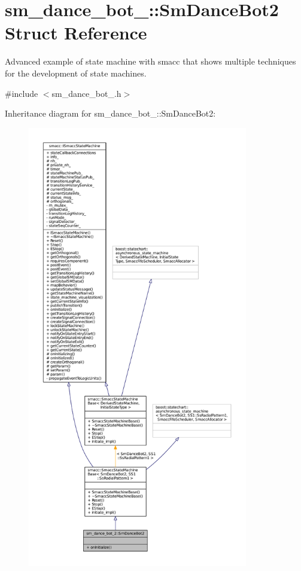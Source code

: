 \hypertarget{structsm__dance__bot__2_1_1SmDanceBot2}{}\section{sm\+\_\+dance\+\_\+bot\+\_\+:\+:Sm\+Dance\+Bot2 Struct Reference}
\label{structsm__dance__bot__2_1_1SmDanceBot2}


Advanced example of state machine with smacc that shows multiple techniques for the development of state machines.  




{\ttfamily \#include $<$sm\+\_\+dance\+\_\+bot\+\_.\+h$>$}



Inheritance diagram for sm\+\_\+dance\+\_\+bot\+\_\+:\+:Sm\+Dance\+Bot2\+:
\nopagebreak
\begin{figure}[H]
\begin{center}
\leavevmode
\includegraphics[height=550pt]{structsm__dance__bot__2_1_1SmDanceBot2__inherit__graph}
\end{center}
\end{figure}


